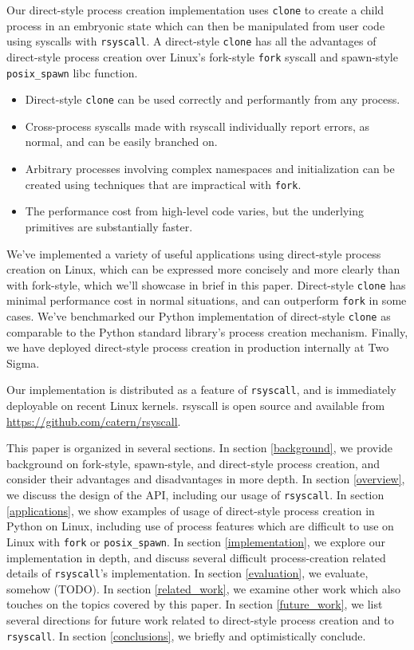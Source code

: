 \documentclass[sigplan]{acmart}
\begin{document}
Our direct-style process creation implementation uses \texttt{clone} to create a child process in an embryonic state
which can then be manipulated from user code using syscalls with \texttt{rsyscall}.
A direct-style \texttt{clone} has all the advantages of direct-style process creation
over Linux's fork-style \texttt{fork} syscall and spawn-style \texttt{posix\_spawn} libc function.
\begin{itemize}
\item
Direct-style \texttt{clone} can be used correctly and performantly from any process.
\item
Cross-process syscalls made with rsyscall individually report errors, as normal, and can be easily branched on.
\item
Arbitrary processes involving complex namespaces and initialization can be created
using techniques that are impractical with \texttt{fork}.
\item
The performance cost from high-level code varies, but the underlying primitives are substantially faster.
\end{itemize}

We've implemented a variety of useful applications using direct-style process creation on Linux,
which can be expressed more concisely and more clearly than with fork-style,
which we'll showcase in brief in this paper.
Direct-style \texttt{clone} has minimal performance cost in normal situations,
and can outperform \texttt{fork} in some cases.
We've benchmarked our Python implementation of direct-style \texttt{clone}
as comparable to the Python standard library's process creation mechanism.
Finally, we have deployed direct-style process creation in production internally at Two Sigma.

Our implementation is distributed as a feature of \texttt{rsyscall},
and is immediately deployable on recent Linux kernels.
rsyscall is open source and available from \url{https://github.com/catern/rsyscall}.

This paper is organized in several sections.
In section \ref{background}, we provide background on fork-style, spawn-style, and direct-style process creation,
and consider their advantages and disadvantages in more depth.
In section \ref{overview}, we discuss the design of the API,
including our usage of \texttt{rsyscall}.
In section \ref{applications}, we show examples of usage of direct-style process creation in Python on Linux,
including use of process features which are difficult to use on Linux with \texttt{fork} or \texttt{posix\_spawn}.
In section \ref{implementation}, we explore our implementation in depth,
and discuss several difficult process-creation related details of \texttt{rsyscall}'s implementation.
In section \ref{evaluation}, we evaluate, somehow (TODO).
In section \ref{related_work},
we examine other work which also touches on the topics covered by this paper.
In section \ref{future_work},
we list several directions for future work related to direct-style process creation and to \texttt{rsyscall}.
In section \ref{conclusions}, we briefly and optimistically conclude.
\end{document}
